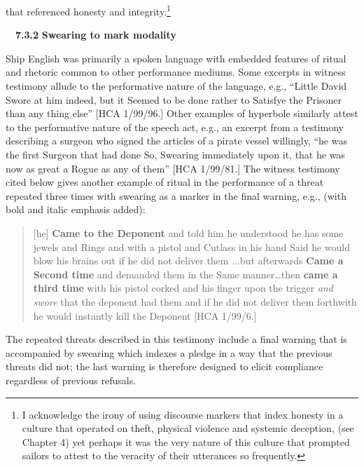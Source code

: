 \begin{styleStandard}
that referenced honesty and integrity.\footnote{ I acknowledge the irony of using discourse markers that index honesty in a culture that operated on theft, physical violence and systemic deception, (see Chapter 4) yet perhaps it was the very nature of this culture that prompted sailors to attest to the veracity of their utterances so frequently. }
\end{styleStandard}


\begin{styleStandard}
\ \ \textbf{7.3.2} \textbf{Swearing to mark modality}
\end{styleStandard}


\begin{styleStandard}
Ship English was primarily a spoken language with embedded features of ritual and rhetoric common to other performance mediums. Some excerpts in witness testimony allude to the performative nature of the language, e.g., “Little David Swore at him indeed, but it Seemed to be done rather to Satisfye the Prisoner than any thing else” [HCA 1/99/96.] Other examples of hyperbole similarly attest to the performative nature of the speech act, e.g., an excerpt from a testimony describing a surgeon who signed the articles of a pirate vessel willingly, “he was the first Surgeon that had done So, Swearing immediately upon it, that he was now as great a Rogue as any of them” [HCA 1/99/81.] The witness testimony cited below gives another example of ritual in the performance of a threat repeated three times with swearing as a marker in the final warning, e.g., (with bold and italic emphasis added):
\end{styleStandard}


\begin{quotation}
[he] \textbf{Came to the Deponent} and told him he understood he has some jewels and Rings and with a pistol and Cutlass in his hand Said he would blow his brains out if he did not deliver them ...but afterwards \textbf{Came a Second time} and demanded them in the Same manner…then \textbf{came a third time} with his pistol corked and his finger upon the trigger\textit{ and swore }that the deponent had them and if he did not deliver them forthwith he would instantly kill the Deponent [HCA 1/99/6.] 

\end{quotation}
\begin{styleStandard}
The repeated threats described in this testimony include a final warning that is accompanied by swearing which indexes a pledge in a way that the previous threats did not; the last warning is therefore designed to elicit compliance regardless of previous refusals. 
\end{styleStandard}


